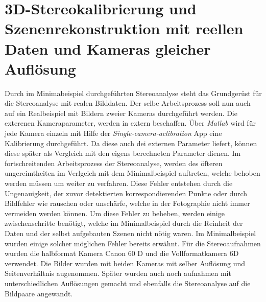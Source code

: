 \chapter{3D-Stereokalibrierung und Szenenrekonstruktion mit reellen Daten und Kameras gleicher Auflösung}
\label{sec:real} 

Durch im Minimabeispiel durchgeführten Stereoanalyse steht das Grundgerüst für die Stereoanalyse mit realen Bilddaten. Der selbe Arbeitsprozess soll nun auch auf ein Realbeispiel mit Bildern zweier Kameras durchgeführt werden. Die exterenen Kameraparameter, werden in extern beschaffen. Über \textit{Matlab} wird für jede Kamera einzeln mit Hilfe der \textit{Single-camera-aclibration} App eine Kalibrierung durchgeführt. Da diese auch dei externen Parameter liefert, können diese später als Vergleich mit den eigens berechneten Parameter dienen. Im fortschreitenden Arbeitsprozess der Stereoanalyse, werden des öfteren ungereimtheiten im Verlgeich mit dem Minimalbeispiel auftreten, welche behoben werden müssen um weiter zu verfahren. Diese Fehler entstehen durch die Ungenauigkeit, der zuvor detektierten korrespondierenden Punkte oder durch Bildfehler wie rauschen oder unschärfe, welche in der Fotographie nicht immer vermeiden werden können. Um diese Fehler zu beheben, werden einige zwischenschritte benötigt, welche im Minimalbeispiel durch die Reinheit der Daten und der selbst aufgebauten Szenen nicht nötig waren. Im Minimalbeispiel wurden einige solcher möglichen Fehler bereits erwähnt. Für die Stereoaufnahmen wurden die halbformat Kamera Canon 60 D und die Vollformatkamera 6D verwendet. Die Bilder wurden mit beiden Kameras mit selber Auflösung und Seitenverhältnis augenommen. Später wurden auch noch aufnahmen mit unterschiedlichen Auflösungen gemacht und ebenfalls die Stereoanalyse auf die Bildpaare angewandt.  \\

